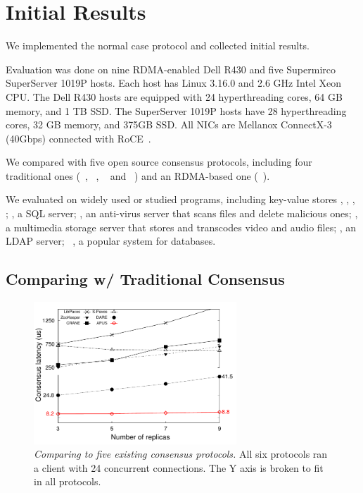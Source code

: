 \section{Initial Results} \label{sec:evaluation}
We implemented the normal case protocol and collected initial 
results.

Evaluation was done on nine RDMA-enabled Dell R430 and five Supermirco 
SuperServer 1019P hosts. Each host has Linux 3.16.0 and 2.6 GHz Intel Xeon 
CPU. The Dell R430 hosts are equipped with 24 hyperthreading cores, 64 GB 
memory, and 1 TB SSD. The SuperServer 1019P hosts have 28 hyperthreading 
cores, 32 GB memory, and 375GB SSD. All NICs are Mellanox ConnectX-3 (40Gbps) 
connected with RoCE~\cite{roce}.

We compared \xxx with five open source consensus protocols, including four 
traditional ones (\libpaxos~\cite{libpaxos}, \zookeeper~\cite{zookeeper}, 
\crane~\cite{crane:sosp15} and \spaxos~\cite{spaxos:srds12}) and an RDMA-based 
one (\dare~\cite{dare:hpdc15}).

We evaluated \xxx on \nprog widely used or studied programs, including
\nkvprog key-value stores \redis, \memcached, \ssdb, \mongodb; \mysql, a SQL
server; \clamav, an anti-virus server that scans files and delete malicious 
ones; \mediatomb, a multimedia storage server that stores and transcodes video 
and audio files; \openldap, an LDAP server; \calvin~\cite{calvin:sigmod12}, a 
popular \smr system for databases.

\subsection{Comparing w/ Traditional Consensus}
\label{sec:eval-traditional}

\begin{figure}[t]
\begin{center}
\includegraphics[width=3in]{figures/traditional_paxos_latency}
\caption{{\em Comparing \xxx to five existing consensus protocols.} All 
six protocols ran a client with 24 concurrent connections. The Y axis is 
broken to fit in all protocols.}
\label{fig:scalability}
\end{center}
\end{figure}

